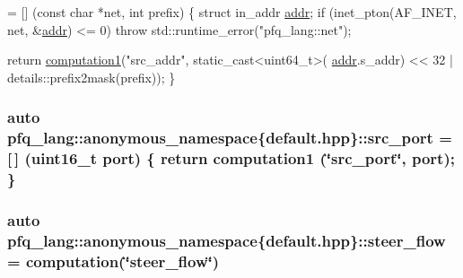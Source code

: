 \begin{DoxyCode}
= [] (\textcolor{keyword}{const} \textcolor{keywordtype}{char} *net, \textcolor{keywordtype}{int} prefix)
        \{
            \textcolor{keyword}{struct }in\_addr \hyperlink{namespacepfq__lang_1_1anonymous__namespace_02default_8hpp_03_aafce8334d1be83bff9a2115439c8c453}{addr};
            \textcolor{keywordflow}{if} (inet\_pton(AF\_INET, net, &\hyperlink{namespacepfq__lang_1_1anonymous__namespace_02default_8hpp_03_aafce8334d1be83bff9a2115439c8c453}{addr}) <= 0)
                \textcolor{keywordflow}{throw} std::runtime\_error(\textcolor{stringliteral}{"pfq\_lang::net"});

            \textcolor{keywordflow}{return} \hyperlink{namespacepfq__lang_a58e7e358fc7c95121f74d56c094b1627}{computation1}(\textcolor{stringliteral}{"src\_addr"}, static\_cast<uint64\_t>(
      \hyperlink{namespacepfq__lang_1_1anonymous__namespace_02default_8hpp_03_aafce8334d1be83bff9a2115439c8c453}{addr}.s\_addr) << 32 | details::prefix2mask(prefix));
        \}
\end{DoxyCode}
\hypertarget{namespacepfq__lang_1_1anonymous__namespace_02default_8hpp_03_ad4d03d1e69ba9608a2d87ac91a2b521f}{
\subsubsection[{src\-\_\-port}]{\setlength{\rightskip}{0pt plus 5cm}auto pfq\-\_\-lang\-::anonymous\-\_\-namespace\{default.\-hpp\}\-::src\-\_\-port = \mbox{[}$\,$\mbox{]} (uint16\-\_\-t {\bf port}) \{ return {\bf computation1} (\char`\"{}src\-\_\-port\char`\"{}, port); \}}}\label{namespacepfq__lang_1_1anonymous__namespace_02default_8hpp_03_ad4d03d1e69ba9608a2d87ac91a2b521f}
\hypertarget{namespacepfq__lang_1_1anonymous__namespace_02default_8hpp_03_aee7b4eb8c316f9c0cd6ee7bc22b517ef}{
\subsubsection[{steer\-\_\-flow}]{\setlength{\rightskip}{0pt plus 5cm}auto pfq\-\_\-lang\-::anonymous\-\_\-namespace\{default.\-hpp\}\-::steer\-\_\-flow = {\bf computation}(\char`\"{}steer\-\_\-flow\char`\"{})}}\label{namespacepfq__lang_1_1anonymous__namespace_02default_8hpp_03_aee7b4eb8c316f9c0cd6ee7bc22b517ef}

